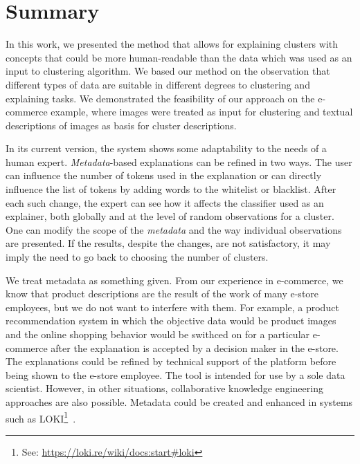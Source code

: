 \documentclass[
 twocolumn,
 hf,
]{ceurart}
\begin{document}
\section{Summary}
\label{sec:summary}
In this work, we presented the method that allows for explaining clusters with concepts that could be more human-readable than the data which was used as an input to clustering algorithm.
We based our method on the observation that different types of data are suitable in different degrees to clustering and explaining tasks.
We demonstrated the feasibility of our approach on the e-commerce example, where images were treated as input for clustering and textual descriptions of images as basis for cluster descriptions.

In its current version, the system shows some adaptability to the needs of a human expert.
\textit{Metadata}-based explanations can be refined in two ways.
The user can influence the number of tokens used in the explanation or can directly influence the list of tokens by adding words to the whitelist or blacklist.
After each such change, the expert can see how it affects the classifier used as an explainer, both globally and at the level of random observations for a cluster.
One can modify the scope of the \textit{metadata} and the way individual observations are presented.
If the results, despite the changes, are not satisfactory, it may imply the need to go back to choosing the number of clusters.

We treat metadata as something given.
From our experience in e-commerce, we know that product descriptions are the result of the work of many e-store employees, but we do not want to interfere with them.
For example, a product recommendation system in which the objective data would be product images and the online shopping behavior would be swithced on for a particular e-commerce after the explanation is accepted by a decision maker in the e-store.
The explanations could be refined by technical support of the platform before being shown to the e-store employee.
The tool is intended for use by a sole data scientist.
However, in other situations, collaborative knowledge engineering approaches are also possible.
Metadata could be created and enhanced in systems such as LOKI\footnote{See: \url{https://loki.re/wiki/docs:start#loki}}~\cite{DBLP:conf/aiia/Kutt16}.
\end{document}
